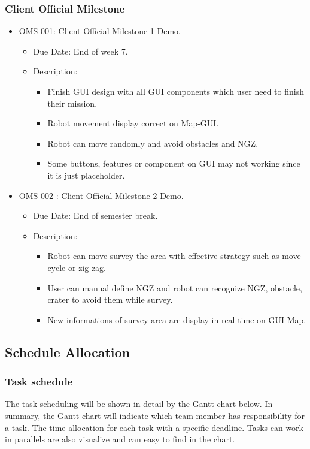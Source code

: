 \documentclass[11pt, a4paper]{article}
\begin{document}
		\subsubsection{Client Official Milestone}
			\begin{itemize}
				\item OMS-001: Client Official Milestone 1 Demo.
				\begin{itemize}
					\item Due Date: End of week 7.
					\item Description:
					\begin{itemize}
						\item Finish GUI design with all GUI components which user need to finish their mission.
						\item Robot movement display correct on Map-GUI.
						\item Robot can move randomly and avoid obstacles and NGZ.
						\item Some buttons, features or component on GUI may not working since it is just placeholder. 
					\end{itemize}
				\end{itemize}
				\item OMS-002 : Client Official Milestone 2 Demo.
				\begin{itemize}
					\item Due Date: End of semester break.
					\item Description:
					\begin{itemize}
						\item Robot can move survey the area with effective strategy such as move cycle or zig-zag.
						\item User can manual define NGZ and robot can recognize NGZ, obstacle, crater to avoid them while survey.
						\item New informations of survey area are display in real-time on GUI-Map.
					\end{itemize}
				\end{itemize}
			\end{itemize}
	\subsection{Schedule Allocation}
	\subsubsection{Task schedule}
	The task scheduling will be shown in detail by the Gantt chart below. In summary, the Gantt chart will indicate which team member has responsibility for a task. The time allocation for each task with a specific  deadline. Tasks can work in parallels are also visualize and can easy to find in the chart.     
\end{document}
